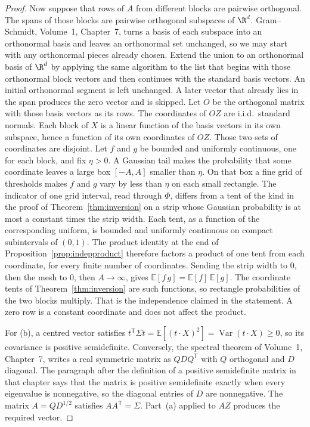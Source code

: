 \begin{proof}
Now suppose that rows of $A$ from different blocks are pairwise orthogonal. The spans of those blocks are pairwise orthogonal subspaces of $\R^d$. Gram--Schmidt, Volume~1, Chapter~7, turns a basis of each subspace into an orthonormal basis and leaves an orthonormal set unchanged, so we may start with any orthonormal pieces already chosen. Extend the union to an orthonormal basis of $\R^d$ by applying the same algorithm to the list that begins with those orthonormal block vectors and then continues with the standard basis vectors. An initial orthonormal segment is left unchanged. A later vector that already lies in the span produces the zero vector and is skipped. Let $O$ be the orthogonal matrix with those basis vectors as its rows. The coordinates of $OZ$ are i.i.d.\ standard normals. Each block of $X$ is a linear function of the basis vectors in its own subspace, hence a function of its own coordinates of $OZ$. Those two sets of coordinates are disjoint. Let $f$ and $g$ be bounded and uniformly continuous, one for each block, and fix $\eta>0$. A Gaussian tail makes the probability that some coordinate leaves a large box $[-A,A]$ smaller than $\eta$. On that box a fine grid of thresholds makes $f$ and $g$ vary by less than $\eta$ on each small rectangle. The indicator of one grid interval, read through $\Phi$, differs from a tent of the kind in the proof of Theorem~\ref{thm:inversion} on a strip whose Gaussian probability is at most a constant times the strip width. Each tent, as a function of the corresponding uniform, is bounded and uniformly continuous on compact subintervals of $(0,1)$. The product identity at the end of Proposition~\ref{prop:indepproduct} therefore factors a product of one tent from each coordinate, for every finite number of coordinates. Sending the strip width to $0$, then the mesh to $0$, then $A\to\infty$, gives $\mathbb E[f\,g]=\mathbb E[f]\,\mathbb E[g]$. The coordinate tents of Theorem~\ref{thm:inversion} are such functions, so rectangle probabilities of the two blocks multiply. That is the independence claimed in the statement. A zero row is a constant coordinate and does not affect the product.

For (b), a centred vector satisfies $t^{\mathsf T}\Sigma t=\mathbb E[(t\cdot X)^2]=\operatorname{Var}(t\cdot X)\ge 0$, so its covariance is positive semidefinite. Conversely, the spectral theorem of Volume~1, Chapter~7, writes a real symmetric matrix as $QDQ^{\mathsf T}$ with $Q$ orthogonal and $D$ diagonal. The paragraph after the definition of a positive semidefinite matrix in that chapter says that the matrix is positive semidefinite exactly when every eigenvalue is nonnegative, so the diagonal entries of $D$ are nonnegative. The matrix $A=QD^{1/2}$ satisfies $AA^{\mathsf T}=\Sigma$. Part~(a) applied to $AZ$ produces the required vector.
\end{proof}


